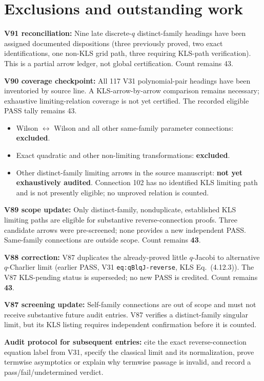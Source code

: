 \documentclass[11pt]{article}
\begin{document}
\section{Exclusions and outstanding work}
\noindent\textbf{V91 reconciliation:} Nine late discrete-$q$ distinct-family headings have been assigned documented dispositions (three previously proved, two exact identifications, one non-KLS grid path, three requiring KLS-path verification). This is a partial arrow ledger, not global certification. Count remains 43.\par
\noindent\textbf{V90 coverage checkpoint:} All 117 V31 polynomial-pair headings have been inventoried by source line. A KLS-arrow-by-arrow comparison remains necessary; exhaustive limiting-relation coverage is not yet certified. The recorded eligible PASS tally remains 43.\par
\begin{itemize}
\item Wilson $\leftrightarrow$ Wilson and all other same-family parameter connections: \textbf{excluded}.
\item Exact quadratic and other non-limiting transformations: \textbf{excluded}.
\item Other distinct-family limiting arrows in the source manuscript: \textbf{not yet exhaustively audited}. Connection 102 has no identified KLS limiting path and is not presently eligible; no unproved relation is counted.
\end{itemize}
\noindent\textbf{V89 scope update:} Only distinct-family, nonduplicate, established KLS limiting paths are eligible for substantive reverse-connection proofs. Three candidate arrows were pre-screened; none provides a new independent PASS. Same-family connections are outside scope. Count remains \textbf{43}.\par
\noindent\textbf{V88 correction:} V87 duplicates the already-proved little $q$-Jacobi to alternative $q$-Charlier limit (earlier PASS, V31 \texttt{eq:qBlqJ-reverse}, KLS Eq.~(4.12.3)). The V87 KLS-pending status is superseded; no new PASS is credited. Count remains \textbf{43}.\par
\noindent\textbf{V87 screening update:} Self-family connections are out of scope and must not receive substantive future audit entries. V87 verifies a distinct-family singular limit, but its KLS listing requires independent confirmation before it is counted.\par
\noindent\textbf{Audit protocol for subsequent entries:} cite the exact reverse-connection equation label from V31, specify the classical limit and its normalization, prove termwise asymptotics or explain why termwise passage is invalid, and record a pass/fail/undetermined verdict.
\end{document}
